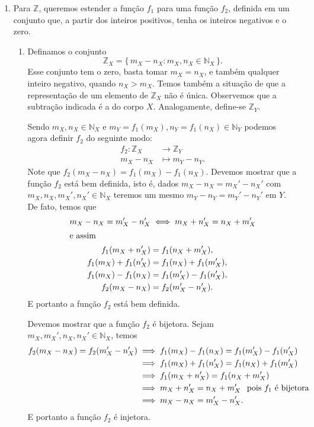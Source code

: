 \documentclass[../main.tex]{subfiles}
\begin{document}
\begin{dem}
\begin{enumerate}
    \item Para $\mathbb{Z}$, queremos estender a função $f_1$ para uma função $f_2$, definida em um conjunto que, a partir dos inteiros positivos, tenha os inteiros negativos e o zero.
        \begin{enumerate}
            \item 
            Definamos o conjunto 
            \[ \mathbb{Z}_X = \{\,m_X - n_X : m_X, n_X \in \mathbb{N}_X \,\}. \] 
            Esse conjunto tem o zero, basta tomar $m_X = n_X$, e também qualquer inteiro negativo, quando $n_X > m_X$. Temos também a situação de que a representação de um elemento de $\mathbb{Z}_X$ não é única. Observemos que a subtração indicada é a do corpo $X$. Analogamente, define-se $\mathbb{Z}_Y$.
            
            Sendo $m_X, n_X \in \mathbb{N}_X$ e $m_Y = f_1(m_X), n_Y=f_1(n_X) \in \mathbb{N}_Y$ podemos agora definir $f_2$ do seguinte modo:
            \begin{align*}
                f_2 \colon \mathbb{Z}_X &\to \mathbb{Z}_Y \\
                m_X - n_X &\mapsto m_Y - n_Y.
            \end{align*}
            Note que $f_2(m_X - n_X) = f_1(m_X) - f_1(n_X)$.
            Devemos mostrar que a função $f_2$ está bem definida, isto é, dados 
            $m_X - n_X = m_X' - n_X'$ com 
            $m_X, n_X, m_X', n_X' \in \mathbb{N}_X$ teremos um mesmo $m_Y - n_Y = m_Y' - n_Y'$ em $Y$. De fato, temos que        
            \begin{align*}
                m_X - n_X = m_X' - n_X' &\iff m_X + n_X' = n_X + m_X' \\ \shortintertext{e assim}
                f_1(m_X + n_X') &= f_1(n_X+m_X'), \\
                f_1(m_X) + f_1(n_X') &= f_1(n_X) + f_1(m_X'), \\
                f_1(m_X) - f_1(n_X) &= f_1(m_X') - f_1(n_X'), \\
                f_2(m_X - n_X) &= f_2(m_X' - n_X').
            \end{align*}
            E portanto a função $f_2$ está bem definida.
        
            Devemos mostrar que a função $f_2$ é bijetora. Sejam $m_X, m_X', n_X, n_X' \in \mathbb{N}_X$, temos
            \begin{align*}
                f_2(m_X - n_X) = f_2(m_X' - n_X') &\implies  f_1(m_X) - f_1(n_X) = f_1(m_X') - f_1(n_X') \\
                &\implies f_1(m_X) + f_1(n_X') = f_1(n_X) + f_1(m_X') \\
                &\implies f_1(m_X + n_X') = f_1(n_X + m_X') \\
                &\implies m_X + n_X' = n_X + m_X' \text{\hspace{4pt} pois $f_1$ é bijetora} \\
                &\implies m_X - n_X = m_X' - n_X'.
            \end{align*}
            E portanto a função $f_2$ é injetora.
        

\end{enumerate}
\end{enumerate}
\end{dem}
\end{document}

